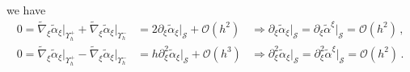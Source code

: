 \documentclass[a4paper,11pt]{scrartcl}
\newcommand{\surf}{\mathcal{S}}
\newcommand{\landau}{\mathcal{O}}
\newcommand{\talpha}{\tilde{\alpha}}
\newcommand{\tnabla}{\tilde{\nabla}}
\newcommand{\boundary}[1]{\Upsilon_{h}^{#1}}
\newcommand{\AtBoundary}[1]{\big|_{\boundary{#1}}}
\newcommand{\AtSurface}{\big|_{\surf}}
\newcommand{\formComma}{\,\text{,}}
\newcommand{\formPeriod}{\,\text{.}}
\begin{document}
    we have
    \begin{align}
      0 = \tnabla_{\xi}\talpha_{\xi}\AtBoundary{+} + \tnabla_{\xi}\talpha_{\xi}\AtBoundary{-}
        &= 2\partial_{\xi}\talpha_{\xi}\AtSurface + \landau(h^{2})
            &\Rightarrow \boxed{\partial_{\xi}\talpha_{\xi}\AtSurface = \partial_{\xi}\talpha^{\xi}\AtSurface = \landau(h^{2})} \formComma\\
      0 = \tnabla_{\xi}\talpha_{\xi}\AtBoundary{+} - \tnabla_{\xi}\talpha_{\xi}\AtBoundary{-}
        &= h\partial_{\xi}^{2}\talpha_{\xi}\AtSurface + \landau(h^{3})
            &\Rightarrow \boxed{\partial_{\xi}^{2}\talpha_{\xi}\AtSurface  = \partial_{\xi}^{2}\talpha^{\xi}\AtSurface = \landau(h^{2})} \formPeriod
    \end{align}
  
    



\end{document}
